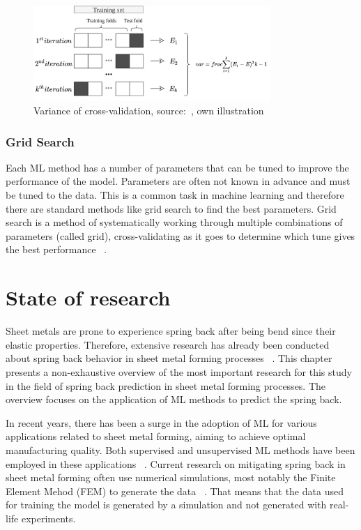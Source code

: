 \begin{figure}[h]
    \begin{tcolorbox}[arc=0pt,boxrule=0.5pt]
        \centering
        \includegraphics[trim=left botm right top, width=0.8\textwidth]
        {chap2/images/cross_validation}
        \caption{Variance of cross-validation, source:~\cite[p. 260]{muller2016introduction}, own
        illustration }
        \label{fig:cross-validation}
    \end{tcolorbox}
\end{figure}


\subsubsection{Grid Search}\label{subsubsec:grid-search}
Each \ac{ML} method has a number of parameters that can be tuned to improve the
performance of the model.
Parameters are often not known in advance and must be tuned to the data.
This is a common task in machine learning and therefore there are standard methods like
grid search to find the best parameters.
Grid search is a method of systematically working through multiple combinations of
parameters (called grid), cross-validating as it goes to determine which tune gives the best
performance
~\cite[p. 260--275]{muller2016introduction}.


\section{State of research}\label{sec:state-of-research}
Sheet metals are prone to experience spring back after being bend since their elastic properties.
Therefore, extensive research has already been conducted about spring back behavior in sheet metal forming processes
~\cite[p. 566]{liu2021deep}.
This chapter presents a non-exhaustive overview of the most important research for this study in the field of
spring back prediction in sheet metal forming processes.
The overview focuses on the application of \ac{ML} methods to predict the spring back.

In recent years, there has been a surge in the adoption of \ac{ML} for various applications related to sheet metal
forming, aiming to achieve optimal manufacturing quality.
Both supervised and unsupervised \ac{ML} methods have been employed in these applications
~\cite[p. 2]{cruz2021application}.
Current research on mitigating spring back in sheet metal forming often use numerical simulations, most notably
the Finite Element Mehod (FEM) to generate the data
~\cite[p. 566]{liu2021deep}.
That means that the data used for training the model is generated by a simulation and not generated with real-life
experiments.

